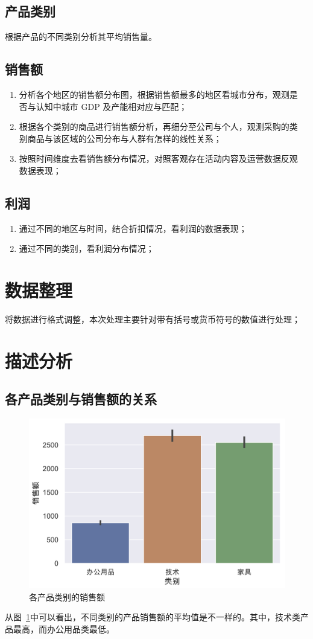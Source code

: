 \documentclass[a4paper]{ctexart}
\begin{document}
\subsection{产品类别}
    根据产品的不同类别分析其平均销售量。
\subsection{销售额}
\begin{enumerate}
    \item 分析各个地区的销售额分布图，根据销售额最多的地区看城市分布，观测是
          否与认知中城市 GDP 及产能相对应与匹配；
    \item 根据各个类别的商品进行销售额分析，再细分至公司与个人，观测采购的类
          别商品与该区域的公司分布与人群有怎样的线性关系；
    \item 按照时间维度去看销售额分布情况，对照客观存在活动内容及运营数据反观
          数据表现；
\end{enumerate}
\subsection{利润}
\begin{enumerate}
    \item 通过不同的地区与时间，结合折扣情况，看利润的数据表现；
    \item 通过不同的类别，看利润分布情况；
\end{enumerate}

\section{数据整理}
将数据进行格式调整，本次处理主要针对带有括号或货币符号的数值进行处理；


\section{描述分析}
\subsection{各产品类别与销售额的关系}
\begin{figure}[H]
    \centering
    \includegraphics[width=.7\textwidth]{figures/prod_avg}
    \caption{各产品类别的销售额}\label{fig:prod}
\end{figure}
从图~\ref{fig:prod}中可以看出，不同类别的产品销售额的平均值是不一样的。其中，技术类产品最高，而办公用品类最低。
\end{document}
